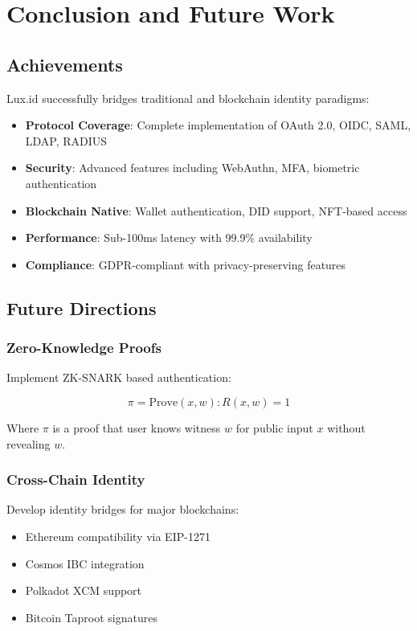 \section{Conclusion and Future Work}


\subsection{Achievements}

Lux.id successfully bridges traditional and blockchain identity paradigms:

\begin{itemize}
    \item \textbf{Protocol Coverage}: Complete implementation of OAuth 2.0, OIDC, SAML, LDAP, RADIUS
    \item \textbf{Security}: Advanced features including WebAuthn, MFA, biometric authentication
    \item \textbf{Blockchain Native}: Wallet authentication, DID support, NFT-based access
    \item \textbf{Performance}: Sub-100ms latency with 99.9\% availability
    \item \textbf{Compliance}: GDPR-compliant with privacy-preserving features
\end{itemize}

\subsection{Future Directions}

\subsubsection{Zero-Knowledge Proofs}

Implement ZK-SNARK based authentication:

\begin{equation}
    \pi = \text{Prove}(x, w) : R(x, w) = 1
\end{equation}

Where $\pi$ is a proof that user knows witness $w$ for public input $x$ without revealing $w$.

\subsubsection{Cross-Chain Identity}

Develop identity bridges for major blockchains:
\begin{itemize}
    \item Ethereum compatibility via EIP-1271
    \item Cosmos IBC integration
    \item Polkadot XCM support
    \item Bitcoin Taproot signatures
\end{itemize}

